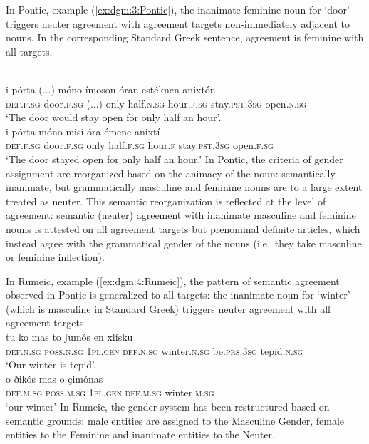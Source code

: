 \documentclass[output=collectionpaper]{langsci/langscibook}
\begin{document}
In Pontic, example (\ref{ex:dgm:3:Pontic}), the inanimate feminine noun for `door' triggers neuter agreement with agreement targets non-immediately adjacent to nouns. In the corresponding Standard Greek sentence, agreement is feminine with all targets.

\ea\label{ex:dgm:3:Pontic}
\ea
{}\\
\gll i p\'orta (...) m\'ono \'imoson \'oran est\'eknen anixt\'on \\
\textsc{def.f.sg} door.\textsc{f.sg} (...) only half.\textsc{n.sg} hour.\textsc{f.sg} stay.\textsc{pst.3sg} open\textsc{.n.sg} \\
\glt `The door would stay open for only half an hour'.
\ex
{}\\
\gll i p\'orta m\'ono mis\'i \'ora \'emene anixt\'i \\
\textsc{def.f.sg} door.\textsc{f.sg} only half\textsc{.f.sg} hour\textsc{.f} stay.\textsc{pst.3sg} open.\textsc{f.sg}\\
\glt `The door stayed open for only half an hour.'
\z
\z
In Pontic, the criteria of gender assignment are reorganized based on the animacy of the noun: semantically inanimate, but grammatically masculine and feminine nouns are to a large extent treated as neuter. This semantic reorganization is reflected at the level of agreement: semantic (neuter) agreement with inanimate masculine and feminine nouns is attested on all agreement targets but prenominal definite articles, which instead agree with the grammatical gender of the nouns (i.e.\ they take masculine or feminine inflection).

In Rumeic, example (\ref{ex:dgm:4:Rumeic}), the pattern of semantic agreement observed in Pontic is generalized to all targets: the inanimate noun for `winter' (which is masculine in Standard Greek) triggers neuter agreement with all agreement targets.
\ea\label{ex:dgm:4:Rumeic}
\ea
{}\\
\gll tu ko mas to ʃum\'os en xl\'isku \\
\textsc{def.n.sg} \textsc{poss.n.sg} \textsc{1pl.gen} \textsc{def.n.sg} winter.\textsc{n.sg} be.\textsc{prs.3sg} tepid.\textsc{n.sg}\\
\glt `Our winter is tepid'.
\ex
{}\\
\gll o ðik\'os mas o \c{c}im\'onas \\
\textsc{def.m.sg} \textsc{poss.m.sg} \textsc{1pl.gen} \textsc{def.m.sg} winter.\textsc{m.sg} \\
\glt `our winter'
\z
\z
In Rumeic, the gender system has been restructured based on semantic grounds: male entities are assigned to the Masculine Gender, female entities to the Feminine and inanimate entities to the Neuter.
\end{document}
